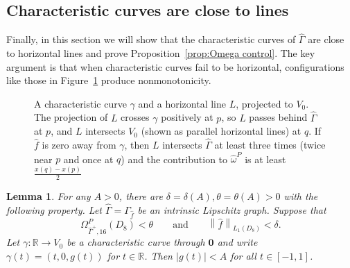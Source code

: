 \documentclass[11pt,reqno]{amsart}
\newcommand{\wwidehat}[1]{\widehat{#1}}
\newcommand{\R}{\mathbb{R}}
\newcommand{\0}{\mathbf{0}}
\renewcommand{\1}{\mathbf 1}
\newcommand{\from}{\colon}
\newtheorem{lemma}[thm]{Lemma}
\theoremstyle{remark}
\begin{document}
\subsection{Characteristic curves are close to lines}

Finally, in this section we will show  that the characteristic curves of $\hat{\Gamma}$ are close to horizontal lines and prove Proposition~\ref{prop:Omega control}.  The key argument is that when characteristic curves fail to be horizontal, configurations like those in Figure~\ref{fig:horizontal curve and line} produce nonmonotonicity.

  \begin{figure}[h]
  \begin{centering}
    
  \end{centering}
  \caption{\label{fig:horizontal curve and line} A characteristic curve $\gamma$ and a horizontal line $L$, projected to $V_0$.  The projection of $L$ crosses $\gamma$ positively at $p$, so $L$ passes behind $\hat{\Gamma}$ at $p$, and $L$ intersects $V_0$ (shown as parallel horizontal lines) at $q$.    If $\hat{f}$ is zero away from $\gamma$, then $L$ intersects $\hat{\Gamma}$ at least three times (twice near $p$ and once at $q$) and the contribution to $\wwidehat{\omega}^P$ is at least $\frac{x(q)-x(p)}{2}$}
\end{figure}

\begin{lemma}\label{lem:close foliation curves squares}
  For any $A>0$, there are $\delta=\delta(A), \theta=\theta(A)>0$ with the following property.  Let $\hat{\Gamma}=\Gamma_{\hat{f}}$ be an intrinsic Lipschitz graph.  Suppose that $$\Omega^P_{\hat{\Gamma}^+,16}(D_{8})< \theta \qquad \mathrm{and}\qquad  \left\|\hat{f}\right\|_{L_1(D_{8})}<\delta.$$  Let $\gamma\from \R\to V_0$ be a characteristic curve through $\mathbf{0}$ and write $\gamma(t)=(t,0,g(t))$ for $t\in \R$.  Then $|g(t)|<A$ for all $t\in [-1,1]$.
\end{lemma}
\end{document}
